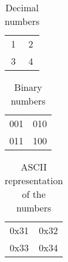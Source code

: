 \documentclass{article}
\begin{document}
\begin{table}
	\centering
	\begin{tabular}{c c}
		1 & 2 \\
		3 & 4
	\end{tabular}
	\caption{Decimal numbers}
\end{table}

\begin{table}
	\centering
	\begin{tabular}{c c}
		001 & 010 \\
		011 & 100
	\end{tabular}
	\caption[Binary numbers - label specific to the list of tables]{Binary numbers}
\end{table}

\begin{table}
	\centering
	\begin{tabular}{c c}
		0x31 & 0x32 \\
		0x33 & 0x34
	\end{tabular}
	\caption*{ASCII representation of the numbers}
\end{table}

\clearpage

\listoftables
\end{document}

